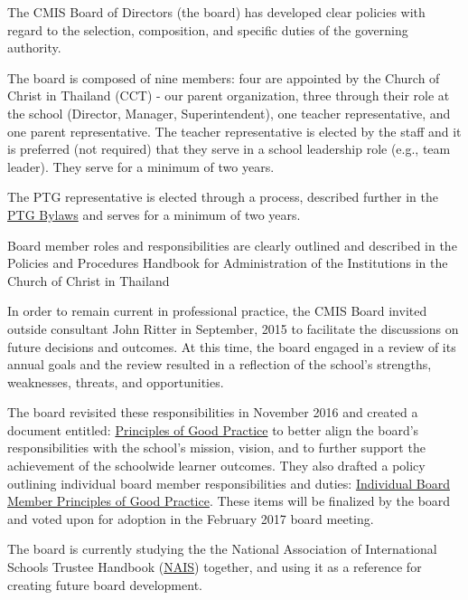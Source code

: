 \begin{findings}
The CMIS Board of Directors (the board) has developed clear policies with regard to the selection, composition, and specific duties of the governing authority. 

The board is composed of nine members: four are appointed by the Church of Christ in Thailand (CCT) - our parent organization, three through their role at the school (Director, Manager, Superintendent), one teacher representative, and one parent representative. The teacher representative is elected by the staff and it is preferred (not required) that they serve in a school leadership role (e.g., team leader). They serve for a minimum of two years.

The PTG representative is elected through a process, described further in the \href{http://blogs.cmis.ac.th/ptg/bylaws/}{PTG Bylaws} and serves for a minimum of two years.

Board member roles and responsibilities are clearly outlined and described in the Policies and Procedures Handbook for Administration of the Institutions in the Church of Christ in Thailand

In order to remain current in professional practice, the CMIS Board invited outside consultant John Ritter in September, 2015 to facilitate the discussions on future decisions and outcomes. At this time, the board engaged in a review of its annual goals and the review resulted in a reflection of the school's strengths, weaknesses, threats, and opportunities. 

The board revisited these responsibilities in November 2016 and created a document entitled:  \href{https://docs.google.com/document/d/1EyIeD5g0RDANtZzH5rsCkvDp5ea_bQ2G9rWnhz4QbSc/edit?ts=5881d18d}{Principles of Good Practice}  to better align the board’s responsibilities with the school’s mission, vision, and to further support the achievement of the schoolwide learner outcomes. They also drafted a policy outlining individual board member responsibilities and duties: \href{https://docs.google.com/document/d/14e90Qr4edga9mEZuHIclWeraZ5jgq052IUwcnxTHQZw/edit?ts=5881b471}{Individual Board Member Principles of Good Practice}. These items will be finalized by the board and voted upon for adoption in the February 2017 board meeting.

The board is currently studying the the National Association of International Schools Trustee Handbook (\href{http://www.nais.org/Articles/Pages/NAIS-Trustee-Handbook-Resources.aspx}{NAIS}) together, and using it as a reference for creating future board development.


\end{findings}
